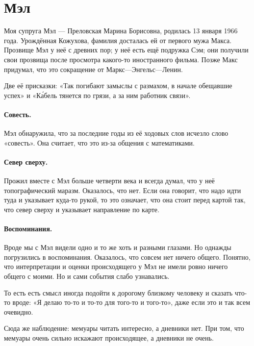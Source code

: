 \documentclass{book}
\begin{document}

\section*{Мэл}

Моя супруга Мэл --- Преловская Марина Борисовна, родилась 13 января 1966 года.
Урождённая Кожухова, фамилия досталась ей от первого мужа Макса.
Прозвище Мэл у неё с древних пор;
у неё есть ещё подружка Сэм; они получили свои прозвища после просмотра какого-то иностранного фильма.
Позже Макс придумал, что это сокращение от Маркс---Энгельс---Ленин.

Две её присказки:
«Так погибают замыслы с размахом, в начале обещавшие успех»
и «К\'{а}бель тянется по грязи, а за ним работник связи».

\paragraph{Совесть.}
Мэл обнаружила, что за последние годы из её ходовых слов исчезло слово «совесть».
Она считает, что это из-за общения с математиками. 

\paragraph{Север сверху.}
Прожил вместе с Мэл больше четверти века и всегда думал, что у неё топографический маразм.
Оказалось, что нет.
Если она говорит, что надо идти туда и указывает куда-то рукой, то это означает, что она стоит перед картой так, что север сверху и указывает направление по карте.

\paragraph{Воспоминания.}
Вроде мы с Мэл видели одно и то же хоть и разными глазами.
Но однажды погрузились в воспоминания.
Оказалось, что совсем нет ничего общего.
Понятно, что интерпретации и оценки происходящего у Мэл не имели ровно ничего общего с моими.
Но и сами события слабо узнавались.

То есть есть смысл иногда подойти к дорогому близкому человеку и сказать что-то вроде: «Я делаю то-то и то-то для того-то и того-то», даже если это и так всем очевидно.

Сюда же наблюдение: мемуары читать интересно, а дневники нет.
При том, что мемуары очень сильно искажают происходящее, а дневники не очень.
\end{document}
